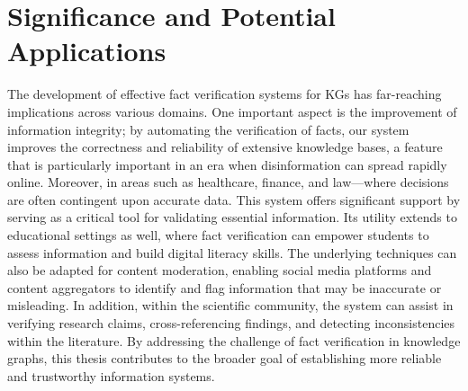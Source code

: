 \section{Significance and Potential Applications}\label{sec:significance}
The development of effective fact verification systems for \acp{KG} has far-reaching implications across various domains.
One important aspect is the improvement of information integrity; by automating the verification of facts, our system improves the correctness and reliability of extensive knowledge bases, a feature that is particularly important in an era when disinformation can spread rapidly online.
Moreover, in areas such as healthcare, finance, and law—where decisions are often contingent upon accurate data.
This system offers significant support by serving as a critical tool for validating essential information.
Its utility extends to educational settings as well, where fact verification can empower students to assess information and build digital literacy skills.
The underlying techniques can also be adapted for content moderation, enabling social media platforms and content aggregators to identify and flag information that may be inaccurate or misleading.
In addition, within the scientific community, the system can assist in verifying research claims, cross-referencing findings, and detecting inconsistencies within the literature.
By addressing the challenge of fact verification in knowledge graphs, this thesis contributes to the broader goal of establishing more reliable and trustworthy information systems.

